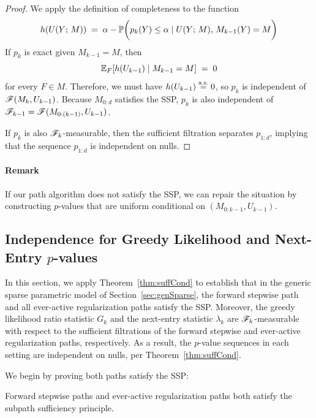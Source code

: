\documentclass{article}
\begin{document}
\begin{proof}
We apply the definition of completeness to the function 
\[
h(U(Y; \, M)) \;=\; 
\alpha - \P\bigg(p_k(Y) \leq \alpha \mid U(Y; \, M), \, M_{k-1}(Y) = M\bigg)
\]
If $p_k$ is exact given $M_{k-1} = M$, then 
\[
\E_F[h(U_{k-1}) \mid M_{k-1}=M] \;=\; 0
\] 
for every $F\in M$. Therefore, we must have $h(U_{k-1})\eqAS 0$, so $p_k$ is independent of $\sF(M_k, U_{k-1})$. Because $M_{0:d}$ satisfies the SSP, $p_k$ is also independent of $\sF_{k-1} = \sF(M_{0:(k-1)}, U_{k-1})$.

If $p_k$ is also $\sF_k$-measurable, then the sufficient filtration separates $p_{1:d}$, implying that the sequence $p_{1:d}$ is independent on nulls.
\end{proof}

\paragraph{Remark} If our path algorithm does not satisfy the SSP, we can repair the situation by constructing $p$-values that are uniform conditional on $(M_{0:k-1},U_{k-1})$.

\subsection{Independence for Greedy Likelihood and Next-Entry $p$-values}\label{sec:indep-greedy-entry}

In this section, we apply Theorem~\ref{thm:suffCond} to establish that in the generic sparse parametric model of Section~\ref{sec:genSparse}, the forward stepwise path and all ever-active regularization paths satisfy the SSP. Moreover, the greedy likelihood ratio statistic $G_k$ and the next-entry statistic $\lambda_k$ are $\sF_k$-measurable with respect to the sufficient filtrations of the forward stepwise and ever-active regularization paths, respectively. As a result, the $p$-value sequences in each setting are independent on nulls, per Theorem~\ref{thm:suffCond}.

We begin by proving both paths satisfy the SSP:
\begin{proposition}\label{prop:forwardSSP}
Forward stepwise paths and ever-active regularization paths both satisfy the subpath sufficiency principle.
\end{proposition}
\end{document}
